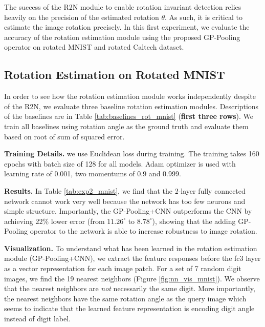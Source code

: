 \documentclass[10pt,twocolumn,letterpaper]{article}
\begin{document}
The success of the R2N module to enable rotation invariant detection relies heavily on the precision of the estimated rotation $\theta$. As such, it is critical to estimate the image rotation precisely. In this first experiment, we evaluate the accuracy of the rotation estimation module using the proposed GP-Pooling operator on rotated MNIST and rotated Caltech dataset.

\subsection{Rotation Estimation on Rotated MNIST} \label{sec:rot_mnist}
In order to see how the rotation estimation module works independently despite of the R2N, we evaluate three baseline rotation estimation modules. Descriptions of the baselines are in Table \ref{tab:baselines_rot_mnist} (\textbf{first three rows}). We train all baselines using rotation angle as the ground truth and evaluate them based on root of sum of squared error.

\vspace{1mm}\noindent\textbf{Training Details.} 
we use Euclidean loss during training. The training takes 160 epochs with batch size of 128 for all models. Adam optimizer is used with learning rate of 0.001, two momentums of 0.9 and 0.999. 

\vspace{1mm}\noindent\textbf{Results.} In Table \ref{tab:exp2_mnist}, we find that the 2-layer fully connected network cannot work very well because the network has too few neurons and simple structure. Importantly, the GP-Pooling+CNN outperforms the CNN by achieving 22\% lower error (from $11.26^{\circ}$ to $8.78^{\circ}$), showing that the adding GP-Pooling operator to the network is able to increase robustness to image rotation. 


\vspace{1mm}\noindent\textbf{Visualization.} To understand what has been learned in the rotation estimation module (GP-Pooling+CNN), we extract the feature responses before the fc3 layer as a vector representation for each image patch. For a set of 7 random digit images, we find the 19 nearest neighbors (Figure \ref{fig:nn_vis_mnist}). We observe that the nearest neighbors are \textit{not} necessarily the same digit. More importantly, the nearest neighbors have the same rotation angle as the query image which seems to indicate that the learned feature representation is encoding digit angle instead of digit label.
\end{document}
